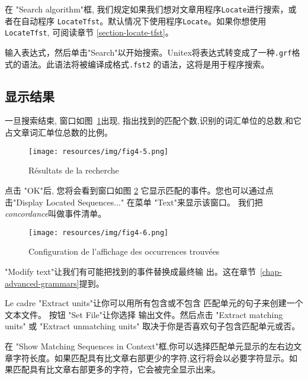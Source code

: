 \bigskip
\noindent 在 "Search algorithm"框, 我们规定如果我们想对文章用程序\verb+Locate+进行搜索，或者在自动程序 \verb+LocateTfst+。默认情况下使用程序\verb+Locate+。如果你想使用\verb+LocateTfst+, 可阅读章节 \ref{section-locate-tfst}。

\bigskip
\noindent 输入表达式，然后单击"Search"以开始搜索。Unitex将表达式转变成了一种\verb+.grf+格式的语法。此语法将被编译成格式\verb+.fst2+ 的语法，这将是用于程序搜索。


\subsection{显示结果}
\label{section-display-occurrences}
一旦搜索结束, 窗口如图~\ref{fig-search-results}出现, 指出找到的匹配个数,识别的词汇单位的总数,和它占文章词汇单位总数的比例。


\bigskip
\begin{figure}[h]
\begin{center}
\texttt{[image: resources/img/fig4-5.png]}
\caption{Résultats de la recherche \label{fig-search-results}}
\end{center}
\end{figure}

\noindent 点击 "OK"后, 您将会看到窗口如图
\ref{fig-configuration-concordance} 它显示匹配的事件。您也可以通过点击"Display Located Sequences..." 在菜单 "Text"来显示该窗口。
我们把\textit{concordance}叫做事件清单。


\bigskip
\begin{figure}[h]
\begin{center}
\texttt{[image: resources/img/fig4-6.png]}
\caption{Configuration de l’affichage des occurrences trouvées\label{fig-configuration-concordance}}
\end{center}
\end{figure}

\bigskip
\noindent "Modify text"让我们有可能把找到的事件替换成最终输
出。这在章节~\ref{chap-advanced-grammars}提到。

\bigskip
\noindent Le cadre "Extract units"让你可以用所有包含或不包含
匹配单元的句子来创建一个文本文件。  按钮 "Set File"让你选择
输出文件。然后点击 "Extract matching units" 或 "Extract unmatching units" 取决于你是否喜欢句子包含匹配单元或否。


\bigskip
\noindent 在 "Show Matching Sequences in Context"框,你可以选择匹配单元显示的左右边文章字符长度。如果匹配具有比文章右部更少的字符,这行将会以必要字符显示。如果匹配具有比文章右部更多的字符，它会被完全显示出来。 


